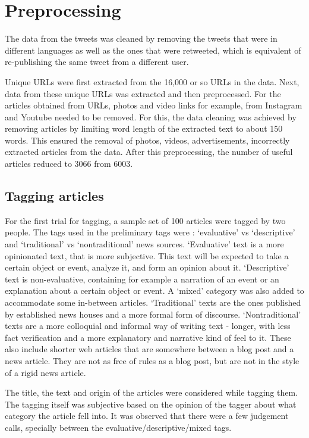 \chapter {Preprocessing}

The data from the tweets was cleaned by removing the tweets that were in different languages as well as the ones that were retweeted, which is equivalent of re-publishing the same tweet from a different user. 

Unique URLs were first extracted from the 16,000 or so URLs in the data. Next, data from these unique URLs was extracted and then preprocessed. For the articles obtained from URLs, photos and video links for example, from Instagram and Youtube needed to be removed. For this, the data cleaning was achieved by removing articles by limiting word length of the extracted text to about 150 words. This ensured the removal of photos, videos, advertisements, incorrectly extracted articles from the data.  After this preprocessing, the number of useful articles reduced to 3066 from 6003.

\section {Tagging articles}

For the first trial for tagging, a sample set of 100 articles were tagged by two people. The tags used in the preliminary tags were : ‘evaluative’ vs ‘descriptive’ and ‘traditional’ vs ‘nontraditional’ news sources. ‘Evaluative’ text is a more opinionated text, that is more subjective. This text will be expected to take a certain object or event, analyze it,  and form an opinion about it. ‘Descriptive’ text is non-evaluative, containing for example a narration of an event or an explanation about a certain object or event. A ‘mixed’ category was also added to accommodate some in-between articles. ‘Traditional’ texts are the ones published by established news houses and a more formal form of discourse. ‘Nontraditional’ texts are a more colloquial and informal way of writing text - longer, with less fact verification and a more explanatory and narrative kind of feel to it. These also include shorter web articles that are somewhere between a blog post and a news article. They are not as free of rules as a blog post, but are not in the style of a rigid news article.

The title, the text and origin of the articles were considered while tagging them. The tagging itself was subjective based on the opinion of the tagger about what category the article fell into. It was observed that there were a few judgement calls, specially between the evaluative/descriptive/mixed tags.


